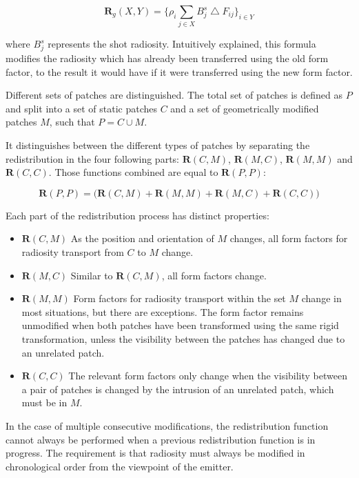 \begin{equation}\label{e:basic-redistribution}
	\mathbf{R}_g(X,Y)=\Biggr\{ \rho_i\sum_{j\in X}B^{s}_j \bigtriangleup F_{ij} \Biggr\}_{i\in Y}
\end{equation}

where $B^{s}_j$ represents the shot radiosity. Intuitively explained, this formula modifies the radiosity which has already been transferred using the old form factor, to the result it would have if it were transferred using the new form factor.

Different sets of patches are distinguished. The total set of patches is defined as $P$ and split into a set of static patches $C$ and a set of geometrically modified patches $M$, such that $P=C\cup M$.

It distinguishes between the different types of patches by separating the redistribution in the four following parts: $\mathbf{R}(C,M)$, $\mathbf{R}(M, C)$, $\mathbf{R}(M, M)$ and $\mathbf{R}(C, C)$. Those functions combined are equal to $\mathbf{R}(P, P)$:

\begin{equation}
	\mathbf{R}(P, P)=\bigg( \mathbf{R}(C,M)+\mathbf{R}(M,M)+\mathbf{R}(M,C)+\mathbf{R}(C,C) \bigg)
\end{equation}

Each part of the redistribution process has distinct properties:

\begin{itemize}
	\item $\mathbf{R}(C,M)$ As the position and orientation of $M$ changes, all form factors for radiosity transport from $C$ to $M$ change.
	\item $\mathbf{R}(M,C)$ Similar to $\mathbf{R}(C,M)$, all form factors change.
	\item $\mathbf{R}(M,M)$ Form factors for radiosity transport within the set $M$ change in most situations, but there are exceptions. The form factor remains unmodified when both patches have been transformed using the same rigid transformation, unless the visibility between the patches has changed due to an unrelated patch.
	\item $\mathbf{R}(C,C)$ The relevant form factors only change when the visibility between a pair of patches is changed by the intrusion of an unrelated patch, which must be in $M$.
\end{itemize}

In the case of multiple consecutive modifications, the redistribution function cannot always be performed when a previous redistribution function is in progress. The requirement is that radiosity must always be modified in chronological order from the viewpoint of the emitter.

